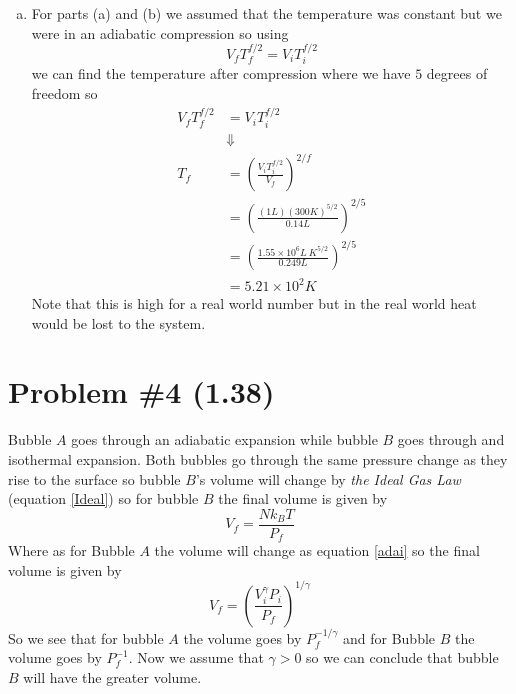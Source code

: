 \documentclass[11pt]{article}
\numberwithin{equation}{section}
\begin{document}
\begin{enumerate}[(a)]
\item
For parts (a) and (b) we assumed that the temperature was constant but we were in an adiabatic compression so using
$$V_fT_f^{f/2} = V_iT_i^{f/2}$$
we can find the temperature after compression where we have $5$ degrees of freedom so 
\begin{align*}
V_fT_f^{f/2} &= V_iT_i^{f/2}\\
&\Downarrow\\
T_f &= \left(\frac{V_iT_i^{f/2}}{V_f}\right)^{2/f}\\
&= \left(\frac{(1\unit{L})(300\unit{K})^{5/2}}{0.14\unit{L}}\right)^{2/5}\\
&= \left(\frac{1.55\times10^{6}\unit{L\ K^{5/2}}}{0.249\unit{L}}\right)^{2/5}\\
&= 5.21\times10^{2}\unit{K}
\end{align*}
Note that this is high for a real world number but in the real world heat would be lost to the system.
\end{enumerate}

\section{Problem \#4 (1.38)}
Bubble $A$ goes through an adiabatic expansion while bubble $B$ goes through and isothermal expansion. Both bubbles go through the same pressure change as they rise to the surface so bubble $B$'s volume will change by \emph{the Ideal Gas Law} (equation \ref{Ideal}) so for bubble $B$ the final volume is given by
$$V_f = \frac{Nk_BT}{P_f}$$
Where as for Bubble $A$ the volume will change as equation \ref{adai} so the final volume is given by
$$V_f = \left(\frac{V_i^{\gamma}P_i}{P_f}\right)^{1/\gamma}$$
So we see that for bubble $A$ the volume goes by $P_f^{-1/\gamma}$ and for Bubble $B$ the volume goes by $P_f^{-1}$. Now we assume that $\gamma>0$ so we can conclude that bubble $B$ will have the greater volume.
\end{document}

